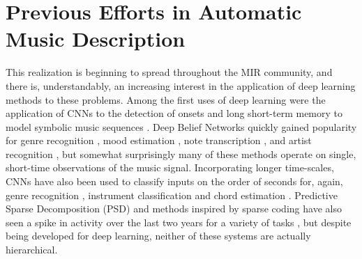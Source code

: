 

\section{Previous Efforts in Automatic Music Description}

This realization is beginning to spread throughout the MIR community, and there is, understandably, an increasing interest in the application of deep learning methods to these problems.
Among the first uses of deep learning were the application of CNNs to the detection of onsets \cite{Lacoste2007} and long short-term memory to model symbolic music sequences \cite{Eck2008}.
Deep Belief Networks quickly gained popularity for genre recognition \cite{Hamel2009}, mood estimation \cite{Schmidt2011}, note transcription \cite{Nam2011}, and artist recognition \cite{Dieleman2011}, but somewhat surprisingly many of these methods operate on single, short-time observations of the music signal.
Incorporating longer time-scales, CNNs have also been used to classify inputs on the order of seconds for, again, genre recognition \cite{Li2010}, instrument classification \cite{Humphrey2010} and chord estimation \cite{Humphrey2011, Humphrey2012b}.
Predictive Sparse Decomposition (PSD) and methods inspired by sparse coding have also seen a spike in activity over the last two years for a variety of tasks \cite{Henaff2011, Nam2012}, but despite being developed for deep learning, neither of these systems are actually hierarchical.

